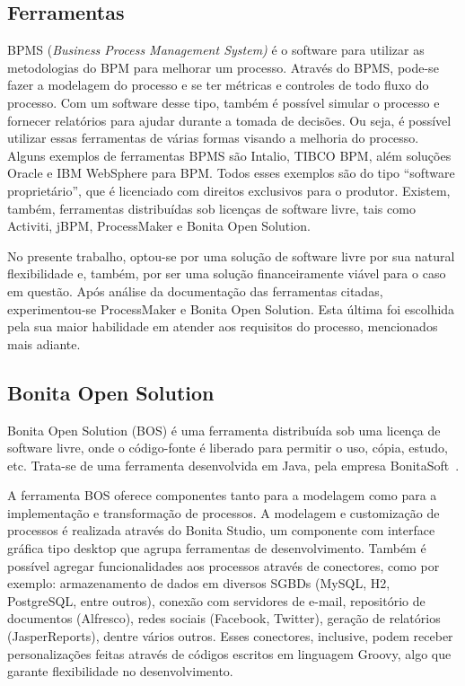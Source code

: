 \documentclass[12pt]{article}
\begin{document}
\subsection{Ferramentas}

BPMS (\emph{Business Process Management System)} é o software para utilizar as metodologias do BPM para melhorar um processo. Através do BPMS, pode-se fazer a modelagem do processo e se ter métricas e controles de todo fluxo do processo. Com um software desse tipo, também é possível simular o processo e fornecer relatórios para ajudar durante a tomada de decisões. Ou seja, é possível utilizar essas ferramentas de várias formas visando a melhoria do processo. Alguns exemplos de ferramentas BPMS são Intalio, TIBCO BPM, além soluções Oracle e IBM WebSphere para BPM. Todos esses exemplos são do tipo “software proprietário”, que é licenciado com direitos exclusivos para o produtor. Existem, também, ferramentas distribuídas sob licenças de software livre, tais como Activiti, jBPM, ProcessMaker e Bonita Open Solution.

No presente trabalho, optou-se por uma solução de software livre por sua natural flexibilidade e, também, por ser uma solução financeiramente viável para o caso em questão. Após análise da documentação das ferramentas citadas, experimentou-se ProcessMaker e Bonita Open Solution. Esta última foi escolhida pela sua maior habilidade em atender aos requisitos do processo, mencionados mais adiante.

\subsection{Bonita Open Solution}

Bonita Open Solution (BOS) é uma ferramenta distribuída sob uma licença de software livre, onde o código-fonte é liberado para permitir o uso, cópia, estudo, etc. Trata-se de uma ferramenta desenvolvida em Java, pela empresa BonitaSoft~\cite{BONITASOFT}.

A ferramenta BOS oferece componentes tanto para a modelagem como para a implementação e transformação de processos. A modelagem e customização de processos é realizada através do Bonita Studio, um componente com interface gráfica tipo desktop que agrupa ferramentas de desenvolvimento. Também é possível agregar funcionalidades aos processos através de conectores, como por exemplo: armazenamento de dados em diversos SGBDs (MySQL, H2, PostgreSQL, entre outros), conexão com servidores de e-mail, repositório de documentos (Alfresco), redes sociais (Facebook, Twitter), geração de relatórios (JasperReports), dentre vários outros. Esses conectores, inclusive, podem receber personalizações feitas através de códigos escritos em linguagem Groovy, algo que garante flexibilidade no desenvolvimento.
\end{document}
